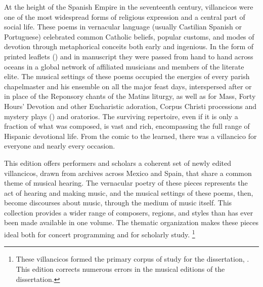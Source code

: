 At the height of the Spanish Empire in the seventeenth century,
villancicos were one of the most widespread forms of religious expression and a central part of social life.
These poems in vernacular language (usually Castilian Spanish or Portuguese) celebrated common Catholic beliefs, popular customs, and modes of devotion through metaphorical conceits both early and ingenious.
In the form of printed leaflets () and in manuscript they were passed from hand to hand across oceans in a global network of affiliated musicians and members of the literate elite.
The musical settings of these poems occupied the energies of every parish chapelmaster and his ensemble on all the major feast days, interspersed after or in place of the Reponsory chants of the Matins liturgy, as well as for Mass, Forty Hours' Devotion and other Eucharistic adoration, Corpus Christi processions and mystery plays () and oratorios.
The surviving repertoire, even if it is only a fraction of what was composed, is vast and rich, encompassing the full range of Hispanic devotional life.
From the comic to the learned, there was a villancico for everyone and nearly every occasion.

This edition offers performers and scholars a coherent set of newly edited villancicos, drawn from archives across Mexico and Spain, that share a common theme of musical hearing.
The vernacular poetry of these pieces represents the act of hearing and making music, and the musical settings of these poems, then, become discourses about music, through the medium of music itself.
This collection provides a wider range of composers, regions, and styles than has ever been made available in one volume.
The thematic organization makes these pieces ideal both for concert programming and for scholarly study.%
  \footnote{These villancicos formed the primary corpus of study for the dissertation, \autocite{Cashner:PhD}.
  This edition corrects numerous errors in the musical editions of the dissertation.}



